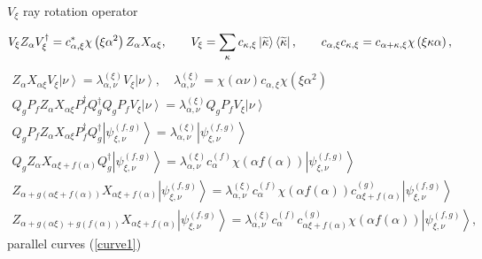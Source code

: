 \documentclass{article}
\begin{document}
$V_{\xi }$ ray rotation operator

\begin{equation*}
V_{\xi }Z_{\alpha }V_{\xi }^{\dag }=c_{\alpha ,\xi }^{\ast }\chi \left( \xi
\alpha ^{2}\right) Z_{\alpha }X_{\alpha \xi },\qquad V_{\xi
}=\dsum\limits_{\kappa }c_{\kappa ,\xi }\left\vert \widetilde{\kappa }%
\right\rangle \left\langle \widetilde{\kappa }\right\vert ,\qquad c_{\alpha
,\xi }c_{\kappa ,\xi }=c_{\alpha +\kappa ,\xi }\chi \left( \xi \kappa \alpha
\right) ,
\end{equation*}%
\begin{gather*}
Z_{\alpha }X_{\alpha \xi }V_{\xi }\left\vert \nu \right\rangle =\lambda
_{\alpha ,\nu }^{\left( \xi \right) }V_{\xi }\left\vert \nu \right\rangle
,\quad \lambda _{\alpha ,\nu }^{\left( \xi \right) }=\chi (\alpha \nu
)c_{\alpha ,\xi }\chi \left( \xi \alpha ^{2}\right)  \\
Q_{g}P_{f}Z_{\alpha }X_{\alpha \xi }P_{f}^{\dag }Q_{g}^{\dag
}Q_{g}P_{f}V_{\xi }\left\vert \nu \right\rangle =\lambda _{\alpha ,\nu
}^{\left( \xi \right) }Q_{g}P_{f}V_{\xi }\left\vert \nu \right\rangle  \\
Q_{g}P_{f}Z_{\alpha }X_{\alpha \xi }P_{f}^{\dag }Q_{g}^{\dag }\left\vert
\psi _{\xi ,\nu }^{\left( f,g\right) }\right\rangle =\lambda _{\alpha ,\nu
}^{\left( \xi \right) }\left\vert \psi _{\xi ,\nu }^{\left( f,g\right)
}\right\rangle  \\
Q_{g}Z_{\alpha }X_{\alpha \xi +f\left( \alpha \right) }Q_{g}^{\dag
}\left\vert \psi _{\xi ,\nu }^{\left( f,g\right) }\right\rangle =\lambda
_{\alpha ,\nu }^{\left( \xi \right) }c_{\alpha }^{\left( f\right) }\chi
\left( \alpha f\left( \alpha \right) \right) \left\vert \psi _{\xi ,\nu
}^{\left( f,g\right) }\right\rangle  \\
Z_{\alpha +g\left( \alpha \xi +f\left( \alpha \right) \right) }X_{\alpha \xi
+f\left( \alpha \right) }\left\vert \psi _{\xi ,\nu }^{\left( f,g\right)
}\right\rangle =\lambda _{\alpha ,\nu }^{\left( \xi \right) }c_{\alpha
}^{\left( f\right) }\chi \left( \alpha f\left( \alpha \right) \right)
c_{\alpha \xi +f\left( \alpha \right) }^{\left( g\right) }\left\vert \psi
_{\xi ,\nu }^{\left( f,g\right) }\right\rangle  \\
Z_{\alpha +g\left( \alpha \xi \right) +g\left( f\left( \alpha \right)
\right) }X_{\alpha \xi +f\left( \alpha \right) }\left\vert \psi _{\xi ,\nu
}^{\left( f,g\right) }\right\rangle =\lambda _{\alpha ,\nu }^{\left( \xi
\right) }c_{\alpha }^{\left( f\right) }c_{\alpha \xi +f\left( \alpha \right)
}^{\left( g\right) }\chi \left( \alpha f\left( \alpha \right) \right)
\left\vert \psi _{\xi ,\nu }^{\left( f,g\right) }\right\rangle ,
\end{gather*}%
parallel curves (\ref{curve1})
\end{document}
